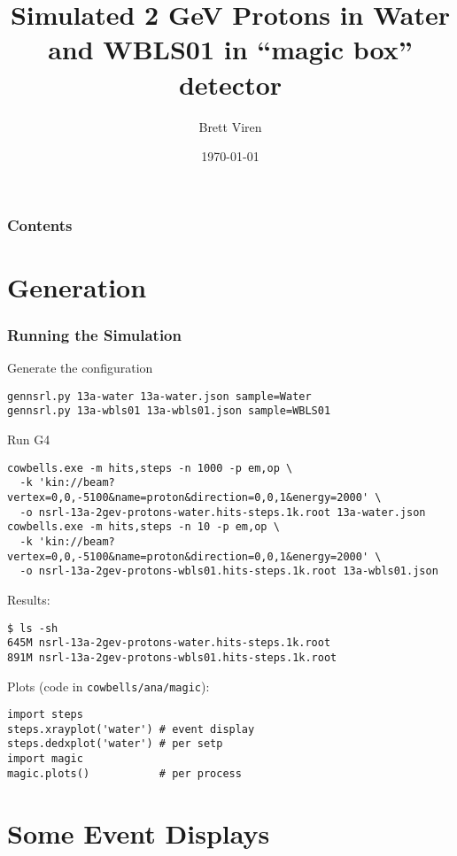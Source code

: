 \documentclass[xcolor=dvipsnames]{beamer}
\begin{document}
\title{Simulated 2 GeV Protons in Water and WBLS01 in ``magic box'' detector}
\author{Brett Viren}
\date{\today}
\frame{\titlepage}

\begin{frame}
  \frametitle{Contents}
  \tableofcontents
\end{frame}

\section{Generation}
\label{sec:gen}

\begin{frame}[fragile]
  \frametitle{Running the Simulation}

  Generate the configuration

{\tiny
\begin{verbatim}
gennsrl.py 13a-water 13a-water.json sample=Water
gennsrl.py 13a-wbls01 13a-wbls01.json sample=WBLS01
\end{verbatim}
}

  Run G4

{\tiny
\begin{verbatim}
cowbells.exe -m hits,steps -n 1000 -p em,op \
  -k 'kin://beam?vertex=0,0,-5100&name=proton&direction=0,0,1&energy=2000' \
  -o nsrl-13a-2gev-protons-water.hits-steps.1k.root 13a-water.json 
cowbells.exe -m hits,steps -n 10 -p em,op \
  -k 'kin://beam?vertex=0,0,-5100&name=proton&direction=0,0,1&energy=2000' \
  -o nsrl-13a-2gev-protons-wbls01.hits-steps.1k.root 13a-wbls01.json
\end{verbatim}
}

 Results:
{\tiny
\begin{verbatim}
$ ls -sh
645M nsrl-13a-2gev-protons-water.hits-steps.1k.root
891M nsrl-13a-2gev-protons-wbls01.hits-steps.1k.root
\end{verbatim}
}

Plots (code in \texttt{cowbells/ana/magic}):
  \begin{lstlisting}[lang=python]
import steps
steps.xrayplot('water') # event display
steps.dedxplot('water') # per setp
import magic
magic.plots()           # per process
  \end{lstlisting}

\end{frame}


\section{Some Event Displays}
\end{document}
